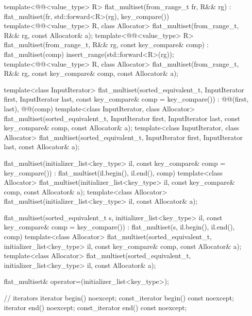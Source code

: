 \begin{codeblock}
{{    template<@@<value_type> R>
      flat_multiset(from_range_t fr, R&& rg)
        : flat_multiset(fr, std::forward<R>(rg), key_compare()) { }
    template<@@<value_type> R, class Allocator>
      flat_multiset(from_range_t, R&& rg, const Allocator& a);
    template<@@<value_type> R>
      flat_multiset(from_range_t, R&& rg, const key_compare& comp)
        : flat_multiset(comp)
        { insert_range(std::forward<R>(rg)); }
    template<@@<value_type> R, class Allocator>
      flat_multiset(from_range_t, R&& rg, const key_compare& comp, const Allocator& a);

    template<class InputIterator>
      flat_multiset(sorted_equivalent_t, InputIterator first, InputIterator last,
                    const key_compare& comp = key_compare())
        : @@(first, last), @@(comp) { }
    template<class InputIterator, class Allocator>
      flat_multiset(sorted_equivalent_t, InputIterator first, InputIterator last,
                    const key_compare& comp, const Allocator& a);
    template<class InputIterator, class Allocator>
      flat_multiset(sorted_equivalent_t, InputIterator first, InputIterator last,
                    const Allocator& a);

    flat_multiset(initializer_list<key_type> il, const key_compare& comp = key_compare())
      : flat_multiset(il.begin(), il.end(), comp) { }
    template<class Allocator>
      flat_multiset(initializer_list<key_type> il, const key_compare& comp, const Allocator& a);
    template<class Allocator>
      flat_multiset(initializer_list<key_type> il, const Allocator& a);

    flat_multiset(sorted_equivalent_t s, initializer_list<key_type> il,
                  const key_compare& comp = key_compare())
        : flat_multiset(s, il.begin(), il.end(), comp) { }
    template<class Allocator>
      flat_multiset(sorted_equivalent_t, initializer_list<key_type> il,
                    const key_compare& comp, const Allocator& a);
    template<class Allocator>
      flat_multiset(sorted_equivalent_t, initializer_list<key_type> il, const Allocator& a);

    flat_multiset& operator=(initializer_list<key_type>);

    // iterators
    iterator               begin() noexcept;
    const_iterator         begin() const noexcept;
    iterator               end() noexcept;
    const_iterator         end() const noexcept;

}}
\end{codeblock}
